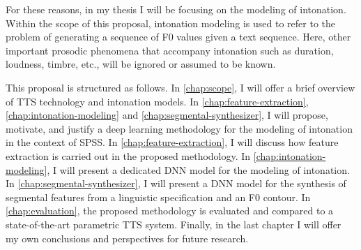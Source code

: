 For these reasons, in my thesis I will be focusing on the modeling of intonation.
Within the scope of this proposal, intonation modeling is used to refer to the problem of generating a sequence of \ac{F0} values given a text sequence. 
Here, other important prosodic phenomena that accompany intonation such as duration, loudness, timbre, etc., will be ignored or assumed to be known.

This proposal is structured as follows.
In \autoref{chap:scope}, I will offer a brief overview of \ac{TTS} technology and intonation models.
In \autoref{chap:feature-extraction}, \autoref{chap:intonation-modeling} and \autoref{chap:segmental-synthesizer}, I will propose, motivate, and justify a deep learning methodology for the modeling of intonation in the context of \ac{SPSS}.
In \autoref{chap:feature-extraction}, I will discuss how feature extraction is carried out in the proposed methodology.
In \autoref{chap:intonation-modeling}, I will present a dedicated \ac{DNN} model for the modeling of intonation.
In \autoref{chap:segmental-synthesizer}, I will present a \ac{DNN} model for the synthesis of segmental features from a linguistic specification and an \ac{F0} contour.
In \autoref{chap:evaluation}, the proposed methodology is evaluated and compared to a state-of-the-art parametric \ac{TTS} system.
Finally, in the last chapter I will offer my own conclusions and perspectives for future research.
